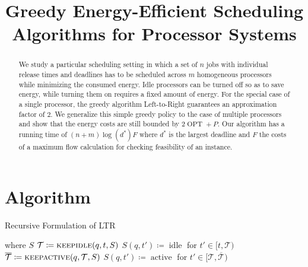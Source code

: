 \documentclass[a4paper]{article}
\title{Greedy Energy-Efficient Scheduling Algorithms for Processor Systems}
\DeclareMathOperator{\idle}{idle}
\DeclareMathOperator{\act}{active}
\DeclareMathOperator{\OPT}{OPT}
\begin{document}
%

\begin{abstract}
  We study a particular scheduling setting in which a set of $n$ jobs with individual release times and deadlines has to be scheduled across $m$ homogeneous processors while minimizing the consumed energy.
  Idle processors can be turned off so as to save energy, while turning them on requires a fixed amount of energy.
  For the special case of a single processor, the greedy algorithm Left-to-Right guarantees an approximation factor of $2$.
  We generalize this simple greedy policy to the case of multiple processors and show that the energy costs are still bounded by $2 \OPT + P$.
  Our algorithm has a running time of $(n + m) \log(d^*) F$ where $d^*$ is the largest deadline and $F$ the costs of a maximum flow calculation for checking feasibility of an instance.
\end{abstract}

\tableofcontents

\section{Algorithm}
\begin{algorithm}[H]
\caption{Recursive Formulation of LTR}\label{alg:RECLTR}
\begin{algorithmic}
  \State{} \Return{} 
  \State{} where
      \Return$S$
      \Return{}
    \Else{}
      \State$\mathcal{T} \coloneqq\Call{keepidle}{q,t,S}$
      \State$S(q,t') \coloneqq \idle$ for $t' \in [t, \mathcal{T})$
      \State$\overline{\mathcal{T}} \coloneqq\Call{keepactive}{q,\mathcal{T},S}$
      \State$S(q,t') \coloneqq \act$ for $t' \in [\mathcal{T}, \overline{\mathcal{T}})$
      \State \Return{}
    \EndIf
  \EndFunction
\end{algorithmic}
\end{algorithm}





%


\end{document}
